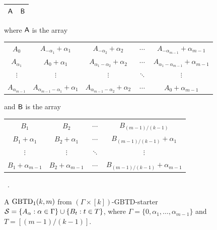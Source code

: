 \documentclass[draft, 11pt]{article}
\begin{document}
 \begin{figure}
 \renewcommand{\arraystretch}{2}
 \setlength{\tabcolsep}{10pt} \centering \Large
\begin{tabular}{|c|c|}
\hline 
${\sf A}$ & ${\sf B}$\\
\hline
\end{tabular}

\vskip 5pt
\normalsize \flushleft where ${\sf A}$ is the array
\vskip 5pt


 \renewcommand{\arraystretch}{1.2}
 \setlength{\tabcolsep}{2pt} \centering \normalsize

 \begin{tabular}{|ccccc|}
 \hline $A_0$ & $A_{-\alpha_{1}}+{\alpha_{1}}$ &
 $A_{-\alpha_{2}}+\alpha_{2}$ & $\cdots$ &
 $A_{-\alpha_{m-1}}+\alpha_{m-1}$ \\
 $A_{\alpha_1}$ & $A_{0}+{\alpha_{1}}$ &
 $A_{\alpha_1-\alpha_{2}}+\alpha_{2}$ & $\cdots$ &
 $A_{\alpha_1-\alpha_{m-1}}+\alpha_{m-1}$ \\
 $\vdots$ & $\vdots$ & $\vdots$ & $\ddots$ & $\vdots$ \\%
 $A_{\alpha_{m-1}}$ & $A_{\alpha_{m-1}-\alpha_1}+{\alpha_{1}}$ &
 $A_{\alpha_{m-1}-\alpha_{2}}+\alpha_{2}$ & $\cdots$ &
 $A_{0}+\alpha_{m-1}$ \\
 \hline
 \end{tabular}


\vskip 5pt
\normalsize \flushleft and ${\sf B}$ is the array
\vskip 5pt

 \renewcommand{\arraystretch}{1.2}
 \setlength{\tabcolsep}{2pt} \centering \normalsize

 \begin{tabular}{|cccc|}
 \hline 
 
 $B_{1}$ & $B_{2}$  & $\cdots$ & $B_{(m-1)/(k-1)}$ \\
 $B_{1}+\alpha_1$ & $B_{2}+\alpha_1$  & $\cdots$ & $B_{(m-1)/(k-1)}+\alpha_1$ \\
 $\vdots$ & $\vdots$  & $\ddots$ & $\vdots$ \\
 $B_{1}+\alpha_{m-1}$ & $B_{2}+\alpha_{m-1}$ & $\cdots$ & $B_{(m-1)/(k-1)}+\alpha_{m-1}$ \\
 \hline
 \end{tabular}\ .





 \caption{A ${\rm GBTD}_1(k,m)$ from
 $(\Gamma\times[k])$-GBTD-starter $\mathcal S=\{A_\alpha: \alpha\in\Gamma\}
 \cup \{B_t: t\in T\}$, where
 $\Gamma=\{0,\alpha_1,\ldots,\alpha_{m-1}\}$ and $T=[(m-1)/(k-1)]$.}
 \label{fig:gbtd3m}
 \end{figure}
 
\end{document}
